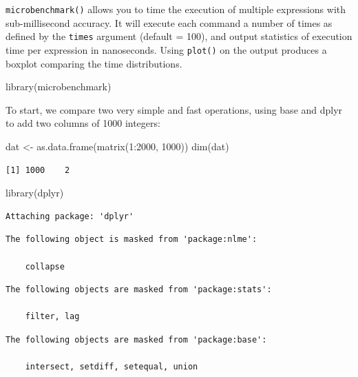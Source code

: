 \documentclass[
]{book}
\newenvironment{Shaded}{\begin{snugshade}}{\end{snugshade}}
\newcommand{\DecValTok}[1]{\textcolor[rgb]{0.00,0.00,0.81}{#1}}
\newcommand{\FunctionTok}[1]{\textcolor[rgb]{0.00,0.00,0.00}{#1}}
\newcommand{\NormalTok}[1]{#1}
\newcommand{\OtherTok}[1]{\textcolor[rgb]{0.56,0.35,0.01}{#1}}
\newcommand{\SpecialCharTok}[1]{\textcolor[rgb]{0.00,0.00,0.00}{#1}}
\begin{document}
\texttt{microbenchmark()} allows you to time the execution of multiple expressions with sub-millisecond accuracy. It will execute each command a number of times as defined by the \texttt{times} argument (default = 100), and output statistics of execution time per expression in nanoseconds. Using \texttt{plot()} on the output produces a boxplot comparing the time distributions.

\begin{Shaded}
\begin{Highlighting}[]
\FunctionTok{library}\NormalTok{(microbenchmark)}
\end{Highlighting}
\end{Shaded}

To start, we compare two very simple and fast operations, using base and dplyr to add two columns of 1000 integers:

\begin{Shaded}
\begin{Highlighting}[]
\NormalTok{dat }\OtherTok{\textless{}{-}} \FunctionTok{as.data.frame}\NormalTok{(}\FunctionTok{matrix}\NormalTok{(}\DecValTok{1}\SpecialCharTok{:}\DecValTok{2000}\NormalTok{, }\DecValTok{1000}\NormalTok{))}
\FunctionTok{dim}\NormalTok{(dat)}
\end{Highlighting}
\end{Shaded}

\begin{verbatim}
[1] 1000    2
\end{verbatim}

\begin{Shaded}
\begin{Highlighting}[]
\FunctionTok{library}\NormalTok{(dplyr)}
\end{Highlighting}
\end{Shaded}

\begin{verbatim}
Attaching package: 'dplyr'
\end{verbatim}

\begin{verbatim}
The following object is masked from 'package:nlme':

    collapse
\end{verbatim}

\begin{verbatim}
The following objects are masked from 'package:stats':

    filter, lag
\end{verbatim}

\begin{verbatim}
The following objects are masked from 'package:base':

    intersect, setdiff, setequal, union
\end{verbatim}
\end{document}
